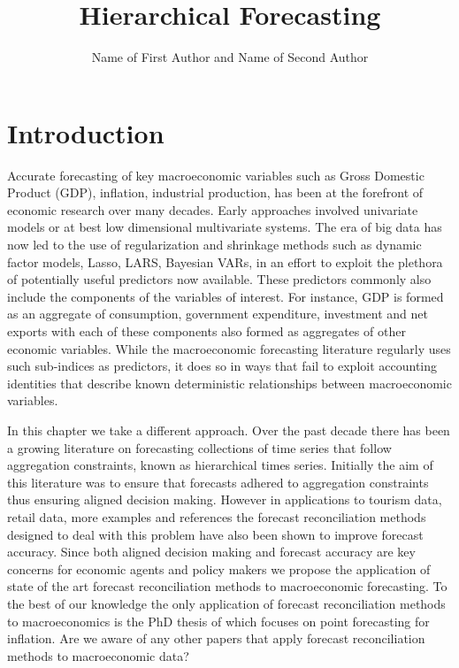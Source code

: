\documentclass[graybox]{svmult}
\begin{document}
\title*{Hierarchical Forecasting}
\author{Name of First Author and Name of Second Author}
%
%
\maketitle

\section{Introduction}\label{sec:intro}
			
Accurate forecasting of key macroeconomic variables such as Gross Domestic Product (GDP), inflation, industrial production, has been at the forefront of economic research over many decades. Early approaches involved univariate models or at best low dimensional multivariate systems. The era of big data has now led to the use of regularization and shrinkage methods such as dynamic factor models, Lasso, LARS, Bayesian VARs, in an effort to exploit the plethora of potentially useful predictors now available. These predictors commonly also include the components of the variables of interest.  For instance, GDP is formed as an aggregate of consumption, government expenditure, investment and net exports with each of these components also formed as aggregates of other economic variables.  While the macroeconomic forecasting literature regularly uses such sub-indices as predictors, it does so in ways that fail to exploit accounting identities that describe known deterministic relationships between macroeconomic variables. 

In this chapter we take a different approach.  Over the past decade there has been a growing literature on forecasting collections of time series that follow aggregation constraints, known as hierarchical times series.  Initially the aim of this literature was to ensure that forecasts adhered to aggregation constraints thus ensuring aligned decision making.  However in applications to tourism data, retail data, {\color{red} more  examples and references} the forecast reconciliation methods designed to deal with this problem have also been shown to improve forecast accuracy.  Since both aligned decision making and forecast accuracy are key concerns for economic agents and policy makers we propose the application of state of the art forecast reconciliation methods to macroeconomic forecasting. To the best of our knowledge the only application of forecast reconciliation methods to macroeconomics is the PhD thesis of \citep{weiss2018essays} which focuses on point forecasting for inflation. {\color{red} Are we aware of any other papers that apply forecast reconciliation methods to macroeconomic data?}
\end{document}
